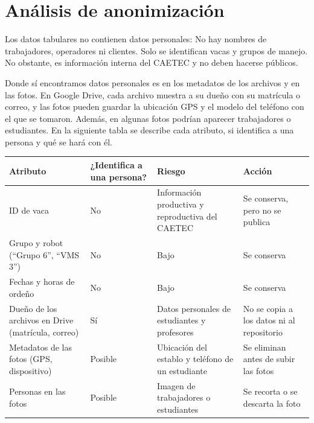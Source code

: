 \section{Análisis de anonimización}

Los datos tabulares no contienen datos personales: No hay nombres de trabajadores, operadores ni clientes. Solo se identifican vacas y grupos de manejo. No obstante, es información interna del CAETEC y no deben hacerse públicos.

Donde sí encontramos datos personales es en los metadatos de los archivos y en las fotos. En Google Drive, cada archivo muestra a su dueño con su matrícula o correo, y las fotos pueden guardar la ubicación GPS y el modelo del teléfono con el que se tomaron. Además, en algunas fotos podrían aparecer trabajadores o estudiantes. En la siguiente tabla se describe cada atributo, si identifica a una persona y qué se hará con él.

\begin{table}[htbp]
  \centering
  \small
  \begin{tabularx}{\textwidth}{>{\raggedright\arraybackslash}X>{\raggedright\arraybackslash}p{}>{\raggedright\arraybackslash}X>{\raggedright\arraybackslash}X}
    \toprule
    Atributo & ¿Identifica a una persona? & Riesgo & Acción \\
    \midrule
    ID de vaca & No & Información productiva y reproductiva del CAETEC & Se conserva, pero no se publica \\
    Grupo y robot (“Grupo 6”, “VMS 3”) & No & Bajo & Se conserva \\
    Fechas y horas de ordeño & No & Bajo & Se conserva \\
    Dueño de los archivos en Drive (matrícula, correo) & Sí & Datos personales de estudiantes y profesores & No se copia a los datos ni al repositorio \\
    Metadatos de las fotos (GPS, dispositivo) & Posible & Ubicación del establo y teléfono de un estudiante & Se eliminan antes de subir las fotos \\
    Personas en las fotos & Posible & Imagen de trabajadores o estudiantes & Se recorta o se descarta la foto \\
    \bottomrule
  \end{tabularx}
\end{table}
